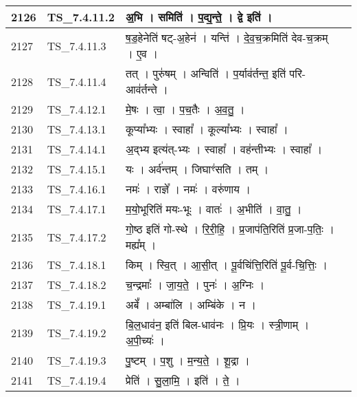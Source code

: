 \documentclass[17pt]{extarticle}
\begin{document}
\begin{longtable}{||p{0.4in}||p{0.9in}||p{4.0in}||p{0.9in}||}
            2126 & TS\_7.4.11.2 & अ॒भि   ।   समिति॑   ।   प॒द्य॒न्ते॒   ।   द्वे इति॑   ।    &      \\
        \hline
            2127 & TS\_7.4.11.3 & ष॒ड॒हेनेति॑ षट्{-}अ॒हेन॑   ।   यन्ति॑   ।   दे॒व॒च॒क्रमिति॑ देव{-}च॒क्रम्   ।   ए॒व   ।    &      \\
        \hline
            2128 & TS\_7.4.11.4 & तत्   ।   पुरु॑षम्   ।   अन्विति॑   ।   प॒र्याव॑र्तन्त॒ इति॑ परि{-}आव॑र्तन्ते   ।    &      \\
        \hline
            2129 & TS\_7.4.12.1 & मे॒षः   ।   त्वा॒   ।   प॒च॒तैः   ।   अ॒व॒तु॒   ।    &      \\
        \hline
            2130 & TS\_7.4.13.1 & कूप्या᳚भ्यः   ।   स्वाहा᳚   ।   कूल्या᳚भ्यः   ।   स्वाहा᳚   ।    &      \\
        \hline
            2131 & TS\_7.4.14.1 & अ॒द्भ्य इत्य॑त्{-}भ्यः   ।   स्वाहा᳚   ।   वह॑न्तीभ्यः   ।   स्वाहा᳚   ।    &      \\
        \hline
            2132 & TS\_7.4.15.1 & यः   ।   अर्व॑न्तम्   ।   जिघाꣳ॑सति   ।   तम्   ।    &      \\
        \hline
            2133 & TS\_7.4.16.1 & नमः॑   ।   राज्ञे᳚   ।   नमः॑   ।   वरु॑णाय   ।    &      \\
        \hline
            2134 & TS\_7.4.17.1 & म॒यो॒भूरिति॑ मयः{-}भूः   ।   वातः॑   ।   अ॒भीति॑   ।   वा॒तु॒   ।    &      \\
        \hline
            2135 & TS\_7.4.17.2 & गो॒ष्ठ इति॑ गो{-}स्थे   ।   रि॒री॒हि॒   ।   प्र॒जाप॑ति॒रिति॑ प्र॒जा{-}प॒तिः॒   ।   मह्य᳚म्   ।    &      \\
        \hline
            2136 & TS\_7.4.18.1 & किम्   ।   स्वि॒त्   ।   आ॒सी॒त्   ।   पू॒र्वचि॑त्ति॒रिति॑ पू॒र्व{-}चि॒त्तिः॒   ।    &      \\
        \hline
            2137 & TS\_7.4.18.2 & च॒न्द्रमाः᳚   ।   जा॒य॒ते॒   ।   पुनः॑   ।   अ॒ग्निः   ।    &      \\
        \hline
            2138 & TS\_7.4.19.1 & अबें᳚   ।   अम्बा॑लि   ।   अम्बि॑के   ।   न   ।    &      \\
        \hline
            2139 & TS\_7.4.19.2 & बि॒ल॒धाव॑न॒ इति॑ बिल{-}धाव॑नः   ।   प्रि॒यः   ।   स्त्री॒णाम्   ।   अ॒पी॒च्यः॑   ।    &      \\
        \hline
            2140 & TS\_7.4.19.3 & पु॒ष्टम्   ।   प॒शु   ।   म॒न्य॒ते॒   ।   शू॒द्रा   ।    &      \\
        \hline
            2141 & TS\_7.4.19.4 & प्रेति॑   ।   सु॒ला॒मि॒   ।   इति॑   ।   ते॒   ।    &      \\

\end{longtable}
\end{document}
